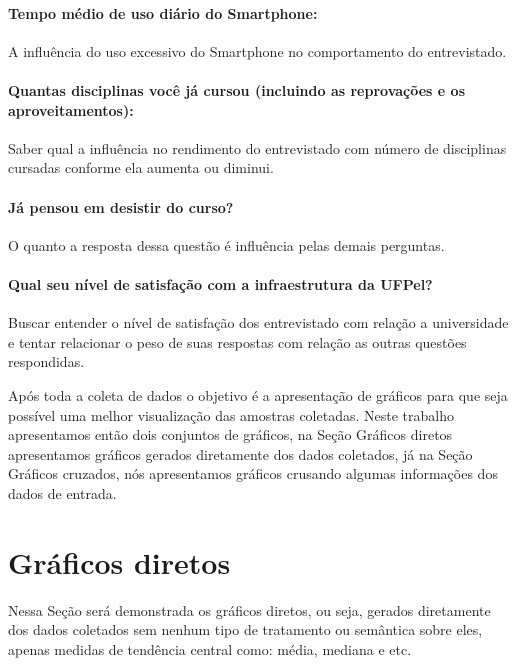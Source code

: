 \documentclass[11pt]{scrartcl} %
\begin{document}
\paragraph{\textbf{Tempo médio de uso diário do Smartphone:}} A influência do uso excessivo do Smartphone no comportamento do entrevistado.

\paragraph{\textbf{Quantas disciplinas você já cursou (incluindo as reprovações e os aproveitamentos):}} Saber qual a influência no rendimento do entrevistado com número de disciplinas cursadas conforme ela aumenta ou diminui.

\paragraph{\textbf{Já pensou em desistir do curso?}} O quanto a resposta dessa questão é influência pelas demais perguntas.  

\paragraph{\textbf{Qual seu nível de satisfação com a infraestrutura da UFPel?}} Buscar entender o nível de satisfação dos entrevistado com relação a universidade e tentar relacionar o peso de suas respostas com  relação as outras questões respondidas.

Após toda a coleta de dados o objetivo é a apresentação de gráficos para que seja possível uma melhor visualização das amostras coletadas. Neste trabalho apresentamos então dois conjuntos de gráficos, na Seção Gráficos diretos apresentamos gráficos gerados diretamente dos dados coletados,
já na Seção Gráficos cruzados, nós apresentamos gráficos crusando algumas informações dos dados de entrada.

\clearpage


\section{Gráficos diretos}

Nessa Seção será demonstrada os gráficos diretos, ou seja, gerados diretamente dos dados coletados sem nenhum tipo de tratamento ou semântica sobre eles, apenas medidas de tendência central como: média, mediana e etc.
\end{document}
